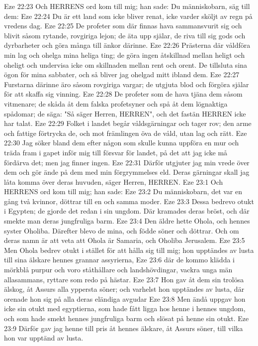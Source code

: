Eze 22:23  Och HERRENS ord kom till mig; han sade: Du människobarn, säg till dem:
Eze 22:24  Du är ett land som icke bliver renat, icke varder sköljt av regn på vredens dag.
Eze 22:25  De profeter som där finnas hava sammansvurit sig och blivit såsom rytande, rovgiriga lejon; de äta upp själar, de riva till sig gods och dyrbarheter och göra många till änkor därinne.
Eze 22:26  Prästerna där våldföra min lag och ohelga mina heliga ting; de göra ingen åtskillnad mellan heligt och oheligt och undervisa icke om skillnaden mellan rent och orent. De tillsluta sina ögon för mina sabbater, och så bliver jag ohelgad mitt ibland dem.
Eze 22:27  Furstarna därinne äro såsom rovgiriga vargar; de utgjuta blod och förgöra själar för att skaffa sig vinning.
Eze 22:28  De profeter som de hava tjäna dem såsom vitmenare; de skåda åt dem falska profetsyner och spå åt dem lögnaktiga spådomar; de säga: "Så säger Herren, HERREN", och det fastän HERREN icke har talat.
Eze 22:29  Folket i landet begår våldsgärningar och tager rov; den arme och fattige förtrycka de, och mot främlingen öva de våld, utan lag och rätt.
Eze 22:30  Jag söker bland dem efter någon som skulle kunna uppföra en mur och träda fram i gapet inför mig till försvar för landet, på det att jag icke må fördärva det; men jag finner ingen.
Eze 22:31  Därför utgjuter jag min vrede över dem och gör ände på dem med min förgrymmelses eld. Deras gärningar skall jag låta komma över deras huvuden, säger Herren, HERREN.
Eze 23:1  Och HERRENS ord kom till mig; han sade:
Eze 23:2  Du människobarn, det var en gång två kvinnor, döttrar till en och samma moder.
Eze 23:3  Dessa bedrevo otukt i Egypten; de gjorde det redan i sin ungdom. Där kramades deras bröst, och där smekte man deras jungfruliga barm.
Eze 23:4  Den äldre hette Ohola, och hennes syster Oholiba. Därefter blevo de mina, och födde söner och döttrar. Och om deras namn är att veta att Ohola är Samaria, och Oholiba Jerusalem.
Eze 23:5  Men Ohola bedrev otukt i stället för att hålla sig till mig; hon upptändes av lusta till sina älskare hennes grannar assyrierna,
Eze 23:6  där de kommo klädda i mörkblå purpur och voro ståthållare och landshövdingar, vackra unga män allasammans, ryttare som redo på hästar.
Eze 23:7  Hon gav åt dem sin trolösa älskog, åt Assurs alla yppersta söner; och varhelst hon upptändes av lusta, där orenade hon sig på alla deras eländiga avgudar
Eze 23:8  Men ändå uppgav hon icke sin otukt med egyptierna, som hade fått ligga hos henne i hennes ungdom, och som hade smekt hennes jungfruliga barm och slösat på henne sin otukt.
Eze 23:9  Därför gav jag henne till pris åt hennes älskare, åt Assurs söner, till vilka hon var upptänd av lusta.
